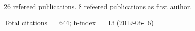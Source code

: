 26 refereed publications. 8 refeered publications as first author.

Total citations~=~644; h-index~=~13 (2019-05-16)
